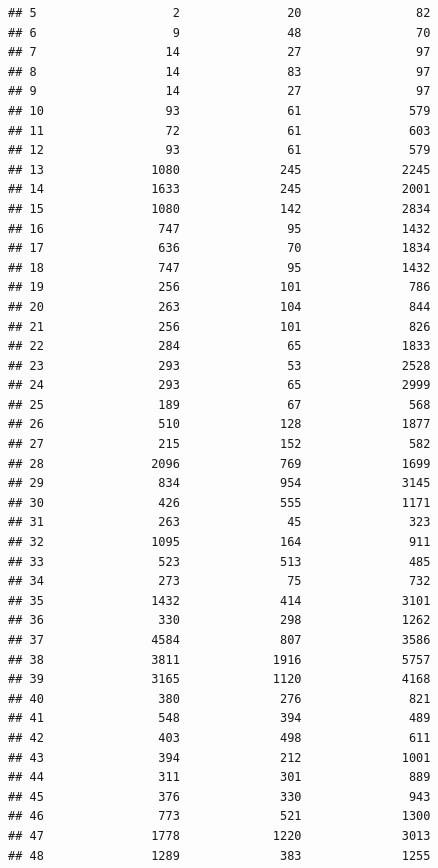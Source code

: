 \documentclass[12pt]{beamer}\usepackage[]{graphicx}\usepackage[]{color}
\makeatletter
\newenvironment{kframe}{%
 \def\at@end@of@kframe{}%
 \ifinner\ifhmode%
  \def\at@end@of@kframe{\end{minipage}}%
  \begin{minipage}{\columnwidth}%
 \fi\fi%
 \def\FrameCommand##1{\hskip\@totalleftmargin \hskip-\fboxsep
 \colorbox{shadecolor}{##1}\hskip-\fboxsep
     \hskip-\linewidth \hskip-\@totalleftmargin \hskip\columnwidth}%
 \MakeFramed {\advance\hsize-\width
   \@totalleftmargin\z@ \linewidth\hsize
   \@setminipage}}%
 {\par\unskip\endMakeFramed%
 \at@end@of@kframe}
\newenvironment{knitrout}{}{} %
\makeatother
\begin{document}
\begin{frame}[fragile]
\begin{knitrout}
\begin{kframe}
\begin{verbatim}
## 5                   2               20                82
## 6                   9               48                70
## 7                  14               27                97
## 8                  14               83                97
## 9                  14               27                97
## 10                 93               61               579
## 11                 72               61               603
## 12                 93               61               579
## 13               1080              245              2245
## 14               1633              245              2001
## 15               1080              142              2834
## 16                747               95              1432
## 17                636               70              1834
## 18                747               95              1432
## 19                256              101               786
## 20                263              104               844
## 21                256              101               826
## 22                284               65              1833
## 23                293               53              2528
## 24                293               65              2999
## 25                189               67               568
## 26                510              128              1877
## 27                215              152               582
## 28               2096              769              1699
## 29                834              954              3145
## 30                426              555              1171
## 31                263               45               323
## 32               1095              164               911
## 33                523              513               485
## 34                273               75               732
## 35               1432              414              3101
## 36                330              298              1262
## 37               4584              807              3586
## 38               3811             1916              5757
## 39               3165             1120              4168
## 40                380              276               821
## 41                548              394               489
## 42                403              498               611
## 43                394              212              1001
## 44                311              301               889
## 45                376              330               943
## 46                773              521              1300
## 47               1778             1220              3013
## 48               1289              383              1255

\end{verbatim}
\end{kframe}
\end{knitrout}
\end{frame}
\end{document}
